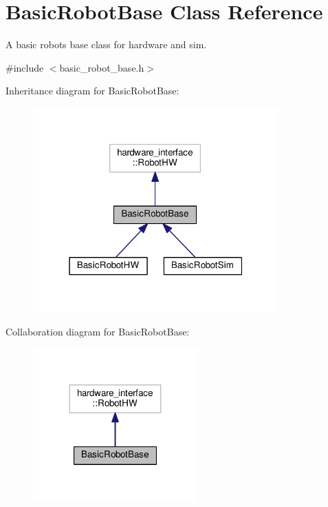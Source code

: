 \hypertarget{classBasicRobotBase}{}\section{Basic\+Robot\+Base Class Reference}
\label{classBasicRobotBase}


A basic robot\textquotesingle{}s base class for hardware and sim.  




{\ttfamily \#include $<$basic\+\_\+robot\+\_\+base.\+h$>$}



Inheritance diagram for Basic\+Robot\+Base\+:\nopagebreak
\begin{figure}[H]
\begin{center}
\leavevmode
\includegraphics[width=268pt]{classBasicRobotBase__inherit__graph}
\end{center}
\end{figure}


Collaboration diagram for Basic\+Robot\+Base\+:\nopagebreak
\begin{figure}[H]
\begin{center}
\leavevmode
\includegraphics[width=179pt]{classBasicRobotBase__coll__graph}
\end{center}
\end{figure}
